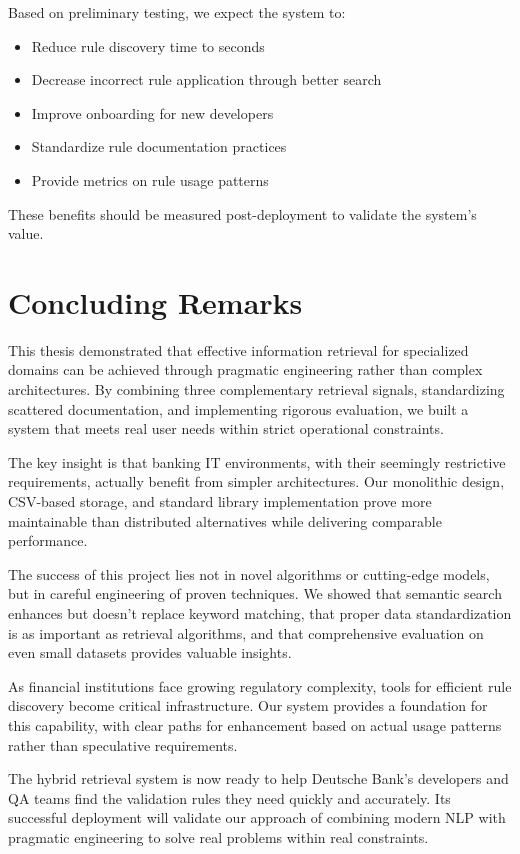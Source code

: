 Based on preliminary testing, we expect the system to:

\begin{itemize}[leftmargin=*,itemsep=2pt,topsep=2pt]
  \item Reduce rule discovery time to seconds
  \item Decrease incorrect rule application through better search
  \item Improve onboarding for new developers
  \item Standardize rule documentation practices
  \item Provide metrics on rule usage patterns
\end{itemize}

These benefits should be measured post-deployment to validate the system's value.

\section{Concluding Remarks}

This thesis demonstrated that effective information retrieval for specialized domains can be achieved through pragmatic engineering rather than complex architectures. By combining three complementary retrieval signals, standardizing scattered documentation, and implementing rigorous evaluation, we built a system that meets real user needs within strict operational constraints.

The key insight is that banking IT environments, with their seemingly restrictive requirements, actually benefit from simpler architectures. Our monolithic design, CSV-based storage, and standard library implementation prove more maintainable than distributed alternatives while delivering comparable performance.

The success of this project lies not in novel algorithms or cutting-edge models, but in careful engineering of proven techniques. We showed that semantic search enhances but doesn't replace keyword matching, that proper data standardization is as important as retrieval algorithms, and that comprehensive evaluation on even small datasets provides valuable insights.

As financial institutions face growing regulatory complexity, tools for efficient rule discovery become critical infrastructure. Our system provides a foundation for this capability, with clear paths for enhancement based on actual usage patterns rather than speculative requirements.

The hybrid retrieval system is now ready to help Deutsche Bank's developers and QA teams find the validation rules they need quickly and accurately. Its successful deployment will validate our approach of combining modern NLP with pragmatic engineering to solve real problems within real constraints.
